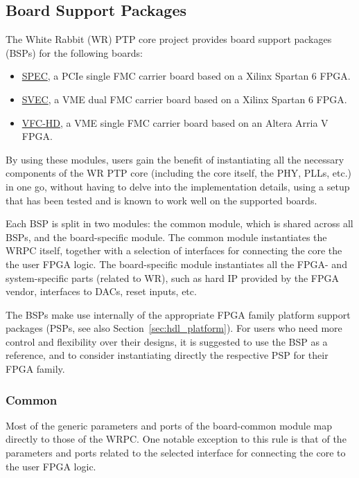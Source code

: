 \subsection{Board Support Packages}
\label{sec:hdl_board}

The White Rabbit (WR) PTP core project provides board support packages (BSPs) for the following
boards:
\begin{itemize}
\item \href{http://www.ohwr.org/projects/spec}{SPEC}, a PCIe single FMC carrier board based on a
  Xilinx Spartan 6 FPGA.
\item \href{http://www.ohwr.org/projects/svec}{SVEC}, a VME dual FMC carrier board based on a Xilinx
  Spartan 6 FPGA.
\item \href{http://www.ohwr.org/projects/vfc-hd}{VFC-HD}, a VME single FMC carrier board based on an
  Altera Arria V FPGA.
\end{itemize}

By using these modules, users gain the benefit of instantiating all the necessary components of the
WR PTP core (including the core itself, the PHY, PLLs, etc.) in one go, without having to delve into
the implementation details, using a setup that has been tested and is known to work well on the
supported boards.

Each BSP is split in two modules: the common module, which is shared across all BSPs, and the
board-specific module. The common module instantiates the WRPC itself, together with a selection of
interfaces for connecting the core the the user FPGA logic. The board-specific module instantiates
all the FPGA- and system-specific parts (related to WR), such as hard IP provided by the FPGA
vendor, interfaces to DACs, reset inputs, etc.

The BSPs make use internally of the appropriate FPGA family platform support packages (PSPs, see also
Section~\ref{sec:hdl_platform}). For users who need more control and flexibility over their designs,
it is suggested to use the BSP as a reference, and to consider instantiating directly the respective
PSP for their FPGA family.

\subsubsection{Common}
\label{sec:hdl_board_common}

Most of the generic parameters and ports of the board-common module map directly to those of the
WRPC. One notable exception to this rule is that of the parameters and ports related to the selected
interface for connecting the core to the user FPGA logic.

